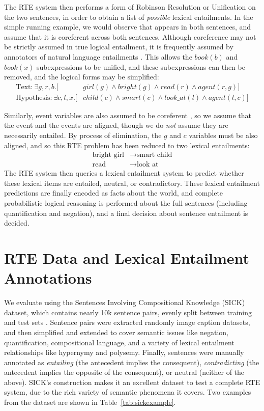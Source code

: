 The RTE system then performs a form of Robinson Resolution or Unification on
the two sentences, in order to obtain a list of {\em possible} lexical
entailments. In the simple running example, we would observe that 
appears in both sentences, and assume that it is coreferent across both
sentences. Although coreference may not be strictly assumed in true logical
entailment, it is frequently assumed by annotators of natural language
entailments \cite{marelli:2014:semeval,bowman:2015:emnlp,beltagy:2016:cl}.
This allows the $book(b)$ and $book(x)$ subexpressions to be unified, and
these subexpressions can then be removed, and the logical forms may
be simplified: 
\begin{align*}
  \mbox{Text:}~\exists g,r,b.[ & girl(g) \wedge bright(g) \wedge read(r) \wedge agent(r, g)]\\
  \mbox{Hypothesis:}~\exists c,l,x.[ & child(c) \wedge smart(c) \wedge look\_at(l) \wedge agent(l, c)]
\end{align*}

Similarly, event variables are also assumed to be coreferent
\cite{bowman:2015:emnlp,beltagy:2016:cl}, so we assume that the 
event and the  events are aligned, though we do {\em not} assume
they are necessarily entailed. By process of elimination, the $g$ and $c$ variables
must be also aligned, and so this RTE problem has been reduced to two
lexical entailments:
\begin{align*}
  \mbox{bright girl} & \rightarrow \mbox{smart child}\\
  \mbox{read} & \rightarrow \mbox{look at}
\end{align*}
The RTE system then queries a lexical entailment system to predict whether
these lexical items are entailed, neutral, or contradictory. These lexical
entailment predictions are finally encoded as facts about the world, and
complete probabilistic logical reasoning is performed about the full sentences
(including quantification and negation), and a final decision about sentence
entailment is decided.

\section{RTE Data and Lexical Entailment Annotations}

We evaluate using the Sentences Involving Compositional Knowledge (SICK)
dataset, which contains nearly 10k sentence pairs, evenly split between
training and test sets \cite{marelli:2014:semeval}. Sentence pairs were
extracted randomly image caption datasets, and then simplified and extended to
cover semantic issues like negation, quantification, compositional language,
and a variety of lexical entailment relationships like hypernymy and polysemy.
Finally, sentences were manually annotated as {\em entailing} (the antecedent
implies the consequent), {\em contradicting} (the antecedent implies the
opposite of the consequent), or neutral (neither of the above). SICK's
construction makes it an excellent dataset to test a complete RTE system, due
to the rich variety of semantic phenomena it covers. Two examples from the
dataset are shown in Table~\ref{tab:sickexample}.

